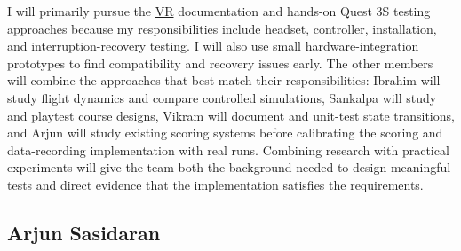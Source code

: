 \documentclass[12pt, titlepage]{article}
\begin{document}
\begin{enumerate}
    I will primarily pursue the \hyperlink{abbr:VR}{VR} documentation and hands-on Quest 3S testing approaches because my responsibilities include headset, controller, installation, and interruption-recovery testing. I will also use small hardware-integration prototypes to find compatibility and recovery issues early. The other members will combine the approaches that best match their responsibilities: Ibrahim will study flight dynamics and compare controlled simulations, Sankalpa will study and playtest course designs, Vikram will document and unit-test state transitions, and Arjun will study existing scoring systems before calibrating the scoring and data-recording implementation with real runs. Combining research with practical experiments will give the team both the background needed to design meaningful tests and direct evidence that the implementation satisfies the requirements.
\end{enumerate}

\subsection*{Arjun Sasidaran}
\end{document}
